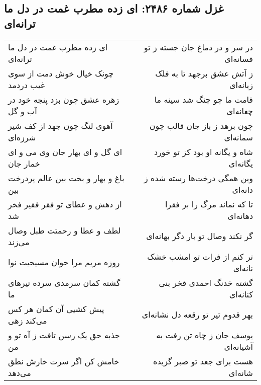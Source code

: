 \begin{center}
\section*{غزل شماره ۲۴۸۶: ای زده مطرب غمت در دل ما ترانه‌ای}
\label{sec:2486}
\begin{longtable}{l p{0.5cm} r}
ای زده مطرب غمت در دل ما ترانه‌ای
&&
در سر و در دماغ جان جسته ز تو فسانه‌ای
\\
چونک خیال خوش دمت از سوی غیب دردمد
&&
ز آتش عشق برجهد تا به فلک زبانه‌ای
\\
زهره عشق چون بزد پنجه خود در آب و گل
&&
قامت ما چو چنگ شد سینه ما چغانه‌ای
\\
آهوی لنگ چون جهد از کف شیر شرزه‌ای
&&
چون برهد ز باز جان قالب چون سمانه‌ای
\\
ای گل و ای بهار جان وی می و ای خمار جان
&&
شاه و یگانه او بود کز تو خورد یگانه‌ای
\\
باغ و بهار و بخت بین عالم پردرخت بین
&&
وین همگی درخت‌ها رسته شده ز دانه‌ای
\\
از دهش و عطای تو فقر فقیر فخر شد
&&
تا که نماند مرگ را بر فقرا دهانه‌ای
\\
لطف و عطا و رحمتت طبل وصال می‌زند
&&
گر نکند وصال تو بار دگر بهانه‌ای
\\
روزه مریم مرا خوان مسیحیت نوا
&&
تر کنم از فرات تو امشب خشک نانه‌ای
\\
گشته کمان سرمدی سرده تیرهای ما
&&
گشته خدنگ احمدی فخر بنی کنانه‌ای
\\
پیش کشیی آن کمان هر کس می‌کند زهی
&&
بهر قدوم تیر تو رقعه دل نشانه‌ای
\\
جذبه حق یک رسن تافت ز آه تو و من
&&
یوسف جان ز چاه تن رفت به آشیانه‌ای
\\
خامش کن اگر سرت خارش نطق می‌دهد
&&
هست برای جعد تو صبر گزیده شانه‌ای
\\
\end{longtable}
\end{center}
